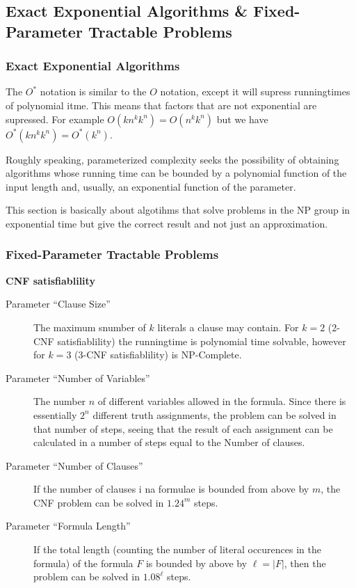 \subsection{Exact Exponential Algorithms \& Fixed-Parameter Tractable Problems}

\subsubsection{Exact Exponential Algorithms}
The $O^*$ notation is similar to the $O$ notation, except it will supress
runningtimes of polynomial itme. This means that factors that are not
exponential are supressed. For example $O(kn^kk^n) = O(n^kk^n)$ but we have
$O^*(kn^kk^n) = O^*(k^n)$.

Roughly speaking, parameterized complexity seeks the possibility of obtaining
algorithms whose running time can be bounded by a polynomial function of the
input length and, usually, an exponential function of the parameter.


This section is basically about algotihms that solve problems in the NP group in
exponential time but give the correct result and not just an approximation.

\subsubsection{Fixed-Parameter Tractable Problems}

\textbf{CNF satisfiablility}
\begin{description}
\item[Parameter ``Clause Size''] The maximum snumber of $k$ literals a clause
  may contain. For $k = 2$ (2-CNF satisfiablility) the runningtime is polynomial
  time solvable, however for $k = 3$ (3-CNF satisfiablility) is NP-Complete.

\item[Parameter ``Number of Variables''] The number $n$ of different variables
  allowed in the formula. Since there is essentially $2^n$ different truth
  assignments, the problem can be solved in that number of steps, seeing that
  the result of each assignment can be calculated in a number of steps equal to
  the Number of clauses.

\item[Parameter ``Number of Clauses''] If the number of clauses i na formulae is
  bounded from above by $m$, the CNF problem can be solved in $1.24^m$ steps.

\item[Parameter ``Formula Length''] If the total length (counting the number of
  literal occurences in the formula) of the formula $F$ is bounded by above by
  $\ell = |F|$, then the problem can be solved in $1.08^\ell$ steps.
\end{description}

